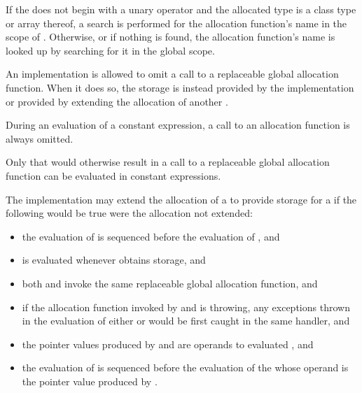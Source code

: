 \pnum
{}%
If the 
does not begin with a unary \tcode{::} operator and
the allocated type is a class type  or array thereof,
a search is performed for the allocation function's name in the scope
of .
Otherwise, or if nothing is found,
the allocation function's name is looked up by
searching for it in the global scope.

\pnum
An implementation is allowed to omit a call to a replaceable global allocation
function. When it does so,
the storage is instead provided by the implementation or provided by extending
the allocation of another .

\pnum
During an evaluation of a constant expression,
a call to an allocation function is always omitted.
\begin{note}
Only  that would otherwise result in
a call to a replaceable global allocation function
can be evaluated in constant expressions.
\end{note}

\pnum
The implementation may
extend the allocation of a   to provide
storage for a   if the
following would be true were the allocation not extended:
\begin{itemize}
\item the evaluation of  is sequenced before the evaluation of
, and

\item {} is evaluated whenever  obtains storage, and

\item both  and  invoke the same replaceable global
allocation function, and

\item if the allocation function invoked by  and  is
throwing, any exceptions thrown in the evaluation of either  or
 would be first caught in the same handler, and

\item the pointer values produced by  and  are operands to
evaluated , and

\item the evaluation of  is sequenced before the evaluation of the
 whose operand is the pointer value produced
by .
\end{itemize}

